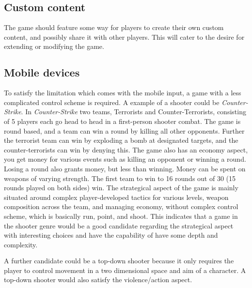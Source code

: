 \subsection{Custom content}\label{sec:selectionofgametype:customcontent}
The game should feature some way for players to create their own custom content, and possibly share it with other players.
This will cater to the desire for extending or modifying the game.

\subsection{Mobile devices}\label{sec:selectionofgametype:mobiledevices}
To satisfy the limitation which comes with the mobile input, a game with a less complicated control scheme is required.
A example of a shooter could be \textit{Counter-Strike}.\cite{counterstrike}
In \textit{Counter-Strike} two teams, Terrorists and Counter-Terrorists, consisting of 5 players each go head to head in a first-person shooter combat. 
The game is round based, and a team can win a round by killing all other opponents. 
Further the terrorist team can win by exploding a bomb at designated targets, and the counter-terrorists can win by denying this. 
The game also has an economy aspect, you get money for various events such as killing an opponent or winning a round.
Losing a round also grants money, but less than winning.
Money can be spent on weapons of varying strength.
The first team to win to 16 rounds out of 30 (15 rounds played on both sides) win. 
The strategical aspect of the game is mainly situated around complex player-developed tactics for various levels, weapon composition across the team, and managing economy, without complex control scheme, which is basically run, point, and shoot.
This indicates that a game in the shooter genre would be a good candidate regarding the strategical aspect with interesting choices and have the capability of have some depth and complexity.

A further candidate could be a top-down shooter because it only requires the player to control movement in a two dimensional space and aim of a character. A top-down shooter would also satisfy the violence/action aspect.

